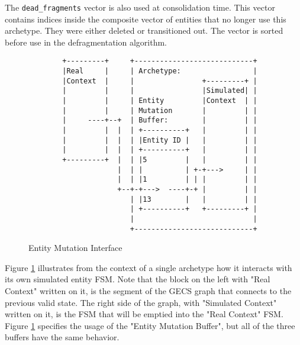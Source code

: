 The \texttt{dead\_fragments} vector is also used at consolidation time. This vector contains indices inside the composite vector of entities that no longer use this archetype. They were either deleted or transitioned out. The vector is sorted before use in the defragmentation algorithm.

\begin{figure}[H]
\begin{verbatim}
        +---------+     +----------------------------+                             
        |Real     |     | Archetype:                 |                             
        |Context  |     |                +---------+ |                             
        |         |     |                |Simulated| |                             
        |         |     | Entity         |Context  | |                             
        |         |     | Mutation       |         | |                             
        |     ----+--+  | Buffer:        |         | |                             
        |         |  |  | +----------+   |         | |                             
        |         |  |  | |Entity ID |   |         | |                             
        |         |  |  | +----------+   |         | |                             
        +---------+  |  | |5         |   |         | |                             
                     |  | |          | +-+--->     | |                             
                     |  | |1         | | |         | |                             
                     +--+-+--->  ----+-+ |         | |                             
                        | |13        |   |         | |                             
                        | +----------+   +---------+ |                             
                        |                            |                             
                        +----------------------------+                                                      
\end{verbatim}
\caption{Entity Mutation Interface}
\label{code:mutation_interface}
\end{figure}

Figure \ref{code:mutation_interface} illustrates from the context of a single archetype how it interacts with its own simulated entity FSM. Note that the block on the left with "Real Context" written on it, is the segment of the GECS graph that connects to the previous valid state. The right side of the graph, with "Simulated Context" written on it, is the FSM that will be emptied into the "Real Context" FSM. Figure \ref{code:mutation_interface} specifies the usage of the "Entity Mutation Buffer", but all of the three buffers have the same behavior.

